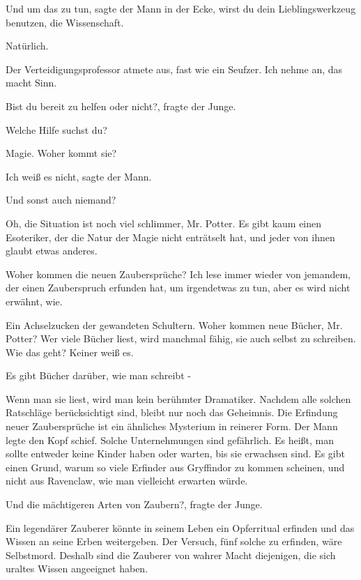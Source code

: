 \glqq Und um das zu tun\grqq{}, sagte der Mann in der Ecke, \glqq wirst du dein
Lieblingswerkzeug benutzen, die Wissenschaft.\grqq{}

\glqq Natürlich.\grqq{}

Der Verteidigungsprofessor atmete aus, fast wie ein Seufzer. \glqq Ich nehme an,
das macht Sinn.\grqq{}

\glqq Bist du bereit zu helfen oder nicht?\grqq{}, fragte der Junge.

\glqq Welche Hilfe suchst du?\grqq{}

\glqq Magie. Woher kommt sie?\grqq{}

\glqq Ich weiß es nicht\grqq{}, sagte der Mann.

\glqq Und sonst auch niemand?\grqq{}

\glqq Oh, die Situation ist noch viel schlimmer, Mr. Potter. Es gibt kaum einen
Esoteriker, der die Natur der Magie nicht enträtselt hat, und jeder von ihnen
glaubt etwas anderes.\grqq{}

\glqq Woher kommen die neuen Zaubersprüche? Ich lese immer wieder von jemandem,
der einen Zauberspruch erfunden hat, um irgendetwas zu tun, aber es wird nicht
erwähnt, wie.\grqq{}

Ein Achselzucken der gewandeten Schultern. \glqq Woher kommen neue Bücher, Mr.
Potter? Wer viele Bücher liest, wird manchmal fähig, sie auch selbst zu
schreiben. Wie das geht? Keiner weiß es.\grqq{}

\glqq Es gibt Bücher darüber, wie man schreibt -\grqq{}

\glqq Wenn man sie liest, wird man kein berühmter Dramatiker. Nachdem alle
solchen Ratschläge berücksichtigt sind, bleibt nur noch das Geheimnis. Die
Erfindung neuer Zaubersprüche ist ein ähnliches Mysterium in reinerer
Form.\grqq{} Der Mann legte den Kopf schief. \glqq Solche Unternehmungen sind
gefährlich. Es heißt, man sollte entweder keine Kinder haben oder warten, bis
sie erwachsen sind. Es gibt einen Grund, warum so viele Erfinder aus Gryffindor
zu kommen scheinen, und nicht aus Ravenclaw, wie man vielleicht erwarten
würde.\grqq{}

\glqq Und die mächtigeren Arten von Zaubern?\grqq{}, fragte der Junge.

\glqq Ein legendärer Zauberer könnte in seinem Leben ein Opferritual erfinden
und das Wissen an seine Erben weitergeben. Der Versuch, fünf solche zu erfinden,
wäre Selbstmord. Deshalb sind die Zauberer von wahrer Macht diejenigen, die sich
uraltes Wissen angeeignet haben.\grqq{}

